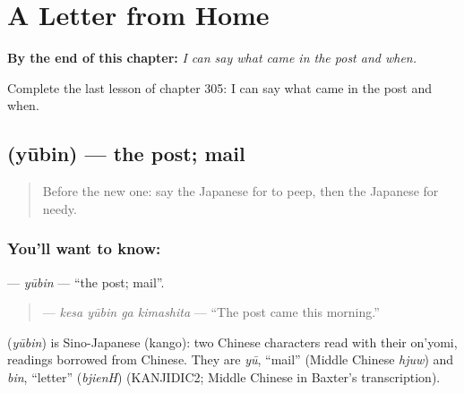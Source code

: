 
\chapter{A Letter from Home}
\label{ch:ja-a-letter-from-home}

\begin{chapteropening}
\textbf{By the end of this chapter:} \emph{I can say what came in the post and when.}

Complete the last lesson of chapter 305: I can say what came in the post and when.
\end{chapteropening}

\section[\texorpdfstring{\ja{ゆうびん} (yūbin)}{ゆうびん (yūbin)}]{ (yūbin) — the post; mail}

\label{lesson:JA-C305-yuubin}



\begin{quote}
Before the new one: say the Japanese for to peep, then the Japanese for needy.
\end{quote}

\subsection*{You'll want to know: }
\textbf{} — \emph{yūbin} — \textquotedblleft{}the post; mail\textquotedblright{}.

\begin{quote}
\textbf{  } — \emph{kesa yūbin ga kimashita} — \textquotedblleft{}The post came this morning.\textquotedblright{}
\end{quote}

\begin{cousinweb}
\textbf{} (\emph{yūbin}) is Sino-Japanese (kango): two Chinese characters read with their on'yomi, readings borrowed from Chinese. They are \emph{yū}, \textquotedblleft{}mail\textquotedblright{} (Middle Chinese \emph{hjuw}) and \emph{bin}, \textquotedblleft{}letter\textquotedblright{} (\emph{bjienH}) (KANJIDIC2; Middle Chinese in Baxter's transcription).
\end{cousinweb}

